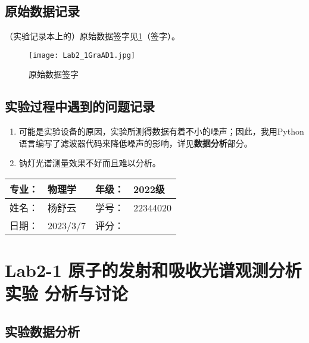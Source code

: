 \documentclass[dvipsnames, svgnames,a4paper,11pt]{article}
\begin{document}
	
	\clearpage
	\subsection{原始数据记录}
	（实验记录本上的）原始数据签字见\cref{fig:figAD1}（签字）。
	
	\begin{figure}[htbp]
		\centering
		\texttt{[image: Lab2\_1GraAD1.jpg]}
		\caption{原始数据签字}
		\label{fig:figAD1}
	\end{figure}
	
	
	
	\subsection{实验过程中遇到的问题记录}
	\begin{enumerate}
		\item 可能是实验设备的原因，实验所测得数据有着不小的噪声；因此，我用Python语言编写了滤波器代码来降低噪声的影响，详见\textbf{数据分析}部分。
		\item 钠灯光谱测量效果不好而且难以分析。
	\end{enumerate}
	
	
	
	\clearpage
	
	\begin{table}
		\renewcommand\arraystretch{1.7}
		\begin{tabularx}{\textwidth}{|X|X|X|X|}
			\hline
			专业：& 物理学 &年级：& 2022级\\
			\hline
			姓名： & 杨舒云 & 学号：& 22344020\\
			\hline
			日期：& 2023/3/7 & 评分：& \\
			\hline
		\end{tabularx}
	\end{table}
	
	\section{Lab2-1 原子的发射和吸收光谱观测分析实验 \quad\heiti 分析与讨论}
	
	\subsection{实验数据分析}
	
\end{document}
